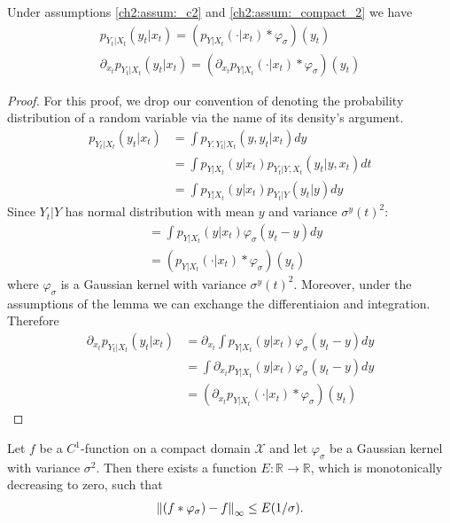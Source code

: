 \begin{lemma}
    \label{ch2:lemma:_blurring}
    Under assumptions \ref{ch2:assum:_c2} and \ref{ch2:assum:_compact_2} we have
    \begin{gather*}
        p_{Y_t | X_t}(y_t | x_t)  = (p_{Y | X_t}(\cdot | x_t) \ast \varphi_\sigma)(y_t) \\
        \partial_{x_t} p_{Y_t | X_t}(y_t | x_t) = (\partial_{x_t} p_{Y| X_t}(\cdot | x_t) \ast \varphi_\sigma)(y_t)
    \end{gather*}
\end{lemma}
\begin{proof}
    For this proof, we drop our convention of denoting the probability distribution of a random variable via the name of its density’s argument.
    \begin{align*}
        p_{Y_t | X_t}(y_t | x_t)  &= \int p_{Y, Y_t| X_t}(y, y_t | x_t) dy 
        \\ &= \int p_{Y | X_t}(y | x_t) p_{Y_t |Y, X_t}(y_t | y, x_t) dt
        \\ &= \int p_{Y | X_t}(y | x_t) p_{Y_t |Y}(y_t | y) dy
    \end{align*}
    Since $Y_t |Y$ has normal distribution with mean $y$ and variance $\sigma^y(t)^2$:
    \begin{align*}
        &= \int p_{Y | X_t}(y | x_t) \varphi_\sigma(y_t - y)  dy 
        \\ &= (p_{Y | X_t}(\cdot | x_t) \ast \varphi_\sigma)(y_t)
    \end{align*}
    where $\varphi_\sigma$ is a Gaussian kernel with variance $\sigma^y(t)^2$.
    Moreover, under the assumptions of the lemma we can exchange the differentiaion and integration. Therefore
    \begin{align*}
        \partial_{x_t} p_{Y_t | X_t}(y_t | x_t) &= \partial_{x_t} \int p_{Y | X_t}(y | x_t) \varphi_\sigma(y_t - y) dy   
        \\ &=  \int \partial_{x_t} p_{Y | X_t}(y | x_t) \varphi_\sigma(y_t - y) dy  
        \\ &= (\partial_{x_t} p_{Y | X_t}(\cdot | x_t) \ast \varphi_\sigma)(y_t)
    \end{align*}
\end{proof}

\begin{lemma}
    \label{ch2:lemma:_sup_norm}
    Let $f$ be a $C^1$-function on a compact domain $\mathcal{X}$ and let $\varphi_\sigma$ be a Gaussian kernel with variance $\sigma^2$. Then there exists a function $E: \mathbb{R} \xrightarrow{} \mathbb{R}$, which is monotonically decreasing to zero, such that
    \begin{gather*}
        \left\lVert (f \ast \varphi_\sigma) - f \right\rVert_{\infty} \leq E(1/\sigma).
    \end{gather*}
\end{lemma}

